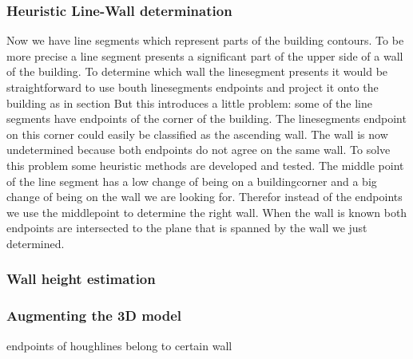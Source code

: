 \subsubsection{Heuristic Line-Wall determination}
	Now we have line segments which represent parts of the building contours. To be more precise a line segment presents a significant part of the upper side of a wall of the building.
	To determine which wall the linesegment presents it would be straightforward to use bouth linesegments endpoints and project it onto the building as in section %
	But this introduces a little problem: some of the line segments have endpoints of the corner of the building.
	The linesegments endpoint on this corner could easily be classified as the ascending wall.
	The wall is now undetermined because both endpoints do not agree on the same wall.  
	To solve this problem some heuristic methods are developed and tested.
	The middle point of the line segment has a low change of being on a buildingcorner and a big change of being on the wall we are looking for.
	Therefor instead of the endpoints we use the middlepoint to determine the right wall.
	When the wall is known both endpoints are intersected to the plane that is spanned by the wall we just determined.

	


\subsubsection{Wall height estimation}

\subsubsection{Augmenting the 3D model} %



endpoints of houghlines belong to certain wall






